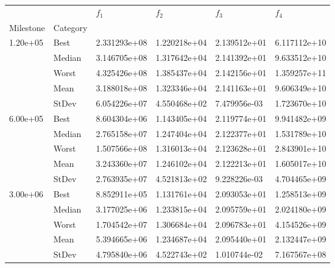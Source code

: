 \begin{tabular}{llllll}
\toprule
         &      &      $f_{1}$ &      $f_{2}$ &      $f_{3}$ &      $f_{4}$ \\
Milestone & Category &              &              &              &              \\
\midrule
\multirow{5}{*}{1.20e+05} & Best & 2.331293e+08 & 1.220218e+04 & 2.139512e+01 & 6.117112e+10 \\
         & Median & 3.146705e+08 & 1.317642e+04 & 2.141392e+01 & 9.633512e+10 \\
         & Worst & 4.325426e+08 & 1.385437e+04 & 2.142156e+01 & 1.359257e+11 \\
         & Mean & 3.188018e+08 & 1.323346e+04 & 2.141163e+01 & 9.606349e+10 \\
         & StDev & 6.054226e+07 & 4.550468e+02 & 7.479956e-03 & 1.723670e+10 \\
\cline{1-6}
\multirow{5}{*}{6.00e+05} & Best & 8.604304e+06 & 1.143405e+04 & 2.119774e+01 & 9.941482e+09 \\
         & Median & 2.765158e+07 & 1.247404e+04 & 2.122377e+01 & 1.531789e+10 \\
         & Worst & 1.507566e+08 & 1.316013e+04 & 2.123628e+01 & 2.843901e+10 \\
         & Mean & 3.243360e+07 & 1.246102e+04 & 2.122213e+01 & 1.605017e+10 \\
         & StDev & 2.763935e+07 & 4.521813e+02 & 9.228226e-03 & 4.704465e+09 \\
\cline{1-6}
\multirow{5}{*}{3.00e+06} & Best & 8.852911e+05 & 1.131761e+04 & 2.093053e+01 & 1.258513e+09 \\
         & Median & 3.177025e+06 & 1.233815e+04 & 2.095759e+01 & 2.024180e+09 \\
         & Worst & 1.704542e+07 & 1.306684e+04 & 2.096783e+01 & 4.154526e+09 \\
         & Mean & 5.394665e+06 & 1.234687e+04 & 2.095440e+01 & 2.132447e+09 \\
         & StDev & 4.795840e+06 & 4.522743e+02 & 1.010744e-02 & 7.167567e+08 \\
\bottomrule
\end{tabular}
